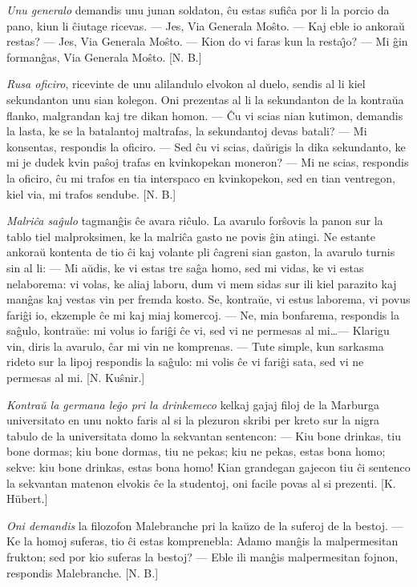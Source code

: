 \emph{Unu generalo} demandis unu junan soldaton, \^cu estas sufi\^ca
por li la porcio da pano, kiun li \^ciutage ricevas. --- Jes, Via
Generala Mo\^sto. --- Kaj eble io ankora\u u restas? --- Jes, Via
Generala Mo\^sto. --- Kion do vi faras kun la resta\^{\j}o? --- Mi
\^gin forman\^gas, Via Generala Mo\^sto. [N. B.]

\emph{Rusa oficiro}, ricevinte de unu alilandulo elvokon al duelo,
sendis al li kiel sekundanton unu sian kolegon. Oni prezentas al li
la sekundanton de la kontra\u ua flanko, malgrandan kaj tre dikan
homon. --- \^Cu vi scias nian kutimon, demandis la lasta, ke se la
batalantoj maltrafas, la sekundantoj devas batali? --- Mi konsentas,
respondis la oficiro. --- Sed \^cu vi scias, da\u urigis la dika
sekundanto, ke mi je dudek kvin pa\^soj trafas en kvinkopekan
moneron? --- Mi ne scias, respondis la oficiro, \^cu mi trafos en
tia interspaco en kvinkopekon, sed en tian ventregon, kiel via, mi
trafos sendube. [N. B.]

\emph{Malri\^ca sa\^gulo} tagman\^gis \^ce avara ri\^culo. La
avarulo for\^sovis la panon sur la tablo tiel malproksimen, ke la
malri\^ca gasto ne povis \^gin atingi. Ne estante ankora\u u
kontenta de tio \^ci kaj volante pli \^cagreni sian gaston, la
avarulo turnis sin al li: --- Mi a\u udis, ke vi estas tre sa\^ga
homo, sed mi vidas, ke vi estas nelaborema: vi volas, ke aliaj
laboru, dum vi mem sidas sur ili kiel parazito kaj man\^gas kaj
vestas vin per fremda kosto. Se, kontra\u ue, vi estus laborema, vi
povus fari\^gi io, ekzemple \^ce mi kaj miaj komercoj. --- Ne, mia
bonfarema, respondis la sa\^gulo, kontra\u ue: mi volus io fari\^gi
\^ce vi, sed vi ne permesas al mi\dots --- Klarigu vin, diris la
avarulo, \^car mi vin ne komprenas. --- Tute simple, kun sarkasma
rideto sur la lipoj respondis la sa\^gulo: mi volis \^ce vi fari\^gi
sata, sed vi ne permesas al mi. [N. Ku\^snir.]

\emph{Kontra\u u la germana le\^go pri la drinkemeco} kelkaj gajaj
filoj de la Marburga universitato en unu nokto faris al si la
plezuron skribi per kreto sur la nigra tabulo de la universitata
domo la sekvantan sentencon: --- Kiu bone drinkas, tiu bone dormas;
kiu bone dormas, tiu ne pekas; kiu ne pekas, estas bona homo; sekve:
kiu bone drinkas, estas bona homo! Kian grandegan gajecon tiu \^ci
sentenco la sekvantan matenon elvokis \^ce la studentoj, oni facile
povas al si prezenti. [K. Hübert.]

\emph{Oni demandis} la filozofon Malebranche pri la ka\u uzo de la
suferoj de la bestoj. --- Ke la homoj suferas, tio \^ci estas
komprenebla: Adamo man\^gis la malpermesitan frukton; sed por kio
suferas la bestoj? --- Eble ili man\^gis malpermesitan fojnon,
respondis Malebranche. [N. B.]

